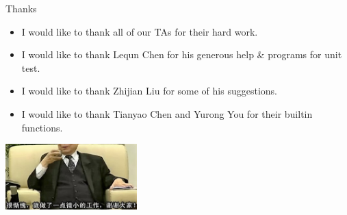 \documentclass{beamer}
\begin{document}
	\begin{frame}
		\begin{block}{Thanks}
			\begin{itemize}
				\item 
				I would like to thank all of our TAs for their hard work.

				\item
				I would like to thank Lequn Chen for his generous help \& programs for unit test.

				\item
				I would like to thank Zhijian Liu for some of his suggestions.

				\item
				I would like to thank Tianyao Chen and Yurong You for their builtin functions.
			
			\end{itemize}
			\centering
			\includegraphics[height=1in]{cankui.jpg}
		\end{block}
	\end{frame}
\end{document}
